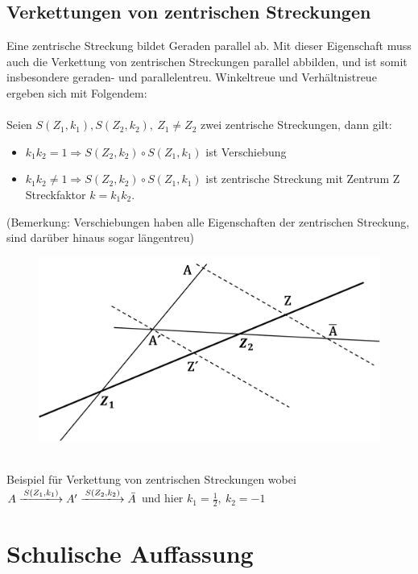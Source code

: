 \documentclass[a4paper,headlines=4, footlines=1]{scrartcl}
\begin{document}
\subsection*{Verkettungen von zentrischen Streckungen}
Eine zentrische Streckung bildet Geraden parallel ab. Mit dieser Eigenschaft muss auch die Verkettung von zentrischen Streckungen parallel abbilden, und ist somit insbesondere geraden- und parallelentreu. Winkeltreue und Verhältnistreue ergeben sich mit Folgendem:
\\\\ Seien $S(Z_1,k_1),S(Z_2,k_2),\ Z_1\ne Z_2$ zwei zentrische Streckungen, dann gilt: \begin{itemize}
	\item $k_1k_2=1 \Rightarrow S(Z_2,k_2)\circ S(Z_1,k_1)$ ist Verschiebung
	\item $k_1k_2\ne 1 \Rightarrow S(Z_2,k_2)\circ S(Z_1,k_1)$ ist zentrische Streckung mit Zentrum Z Streckfaktor $k=k_1k_2$. 
\end{itemize} 
(Bemerkung: Verschiebungen haben alle Eigenschaften der zentrischen Streckung, sind darüber hinaus sogar längentreu)\\
\begin{figure}[!h]
	\centering
	\includegraphics[scale=0.2]{skizzehandout}
\end{figure}\\
Beispiel für Verkettung von zentrischen Streckungen wobei $A\xlongrightarrow{S(Z_1,k_1)}A'\xlongrightarrow{S(Z_2,k_2)}\bar{A}$ und hier $k_1=\frac{1}{2},\ k_2=-1$
\section{Schulische Auffassung}
\end{document}

